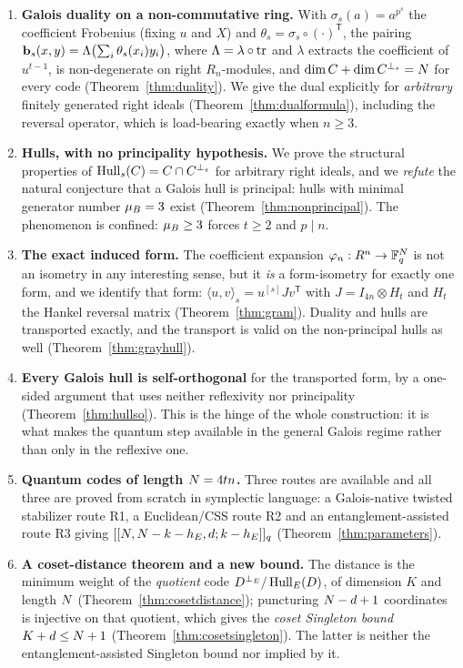 \begin{enumerate}[label=\textnormal{(\arabic*)},leftmargin=*]
\item \textbf{Galois duality on a non-commutative ring.} With
  $\sigma_s(a)=a^{p^s}$ the coefficient Frobenius (fixing $u$ and $X$) and
  $\theta_s=\sigma_s\circ(\cdot)^{\mathsf T}$, the pairing
  $\mathbf b_s(x,y)=\Lambda\bigl(\sum_i\theta_s(x_i)y_i\bigr)$, where
  $\Lambda=\lambda\circ\operatorname{tr}$ and $\lambda$ extracts the coefficient of
  $u^{t-1}$, is non-degenerate on right $R_n$-modules, and
  $\dim C+\dim C^{\perp_s}=N$ for every code (Theorem~\ref{thm:duality}).
  We give the dual explicitly for \emph{arbitrary} finitely generated right
  ideals (Theorem~\ref{thm:dualformula}), including the reversal operator,
  which is load-bearing exactly when $n\ge3$.

\item \textbf{Hulls, with no principality hypothesis.} We prove the structural
  properties of $\operatorname{Hull}_s(C)=C\cap C^{\perp_s}$ for arbitrary right ideals, and
  we \emph{refute} the natural conjecture that a Galois hull is principal: hulls
  with minimal generator number $\mu_B=3$ exist
  (Theorem~\ref{thm:nonprincipal}). The phenomenon is confined:
  $\mu_B\ge3$ forces $t\ge2$ and $p\mid n$.

\item \textbf{The exact induced form.} The coefficient expansion
  $\varphi_n:R^n\to\mathbb F_q^{N}$ is not an isometry in any interesting sense,
  but it \emph{is} a form-isometry for exactly one form, and we identify that
  form: $\langle u,v\rangle^{\widehat{}}_s=u^{[s]}Jv^{\mathsf T}$ with
  $J=I_{4n}\otimes H_t$ and $H_t$ the Hankel reversal matrix
  (Theorem~\ref{thm:gram}). Duality and hulls are transported exactly, and the
  transport is valid on the non-principal hulls as well
  (Theorem~\ref{thm:grayhull}).

\item \textbf{Every Galois hull is self-orthogonal} for the transported form,
  by a one-sided argument that uses neither reflexivity nor principality
  (Theorem~\ref{thm:hullso}). This is the hinge of the whole construction: it
  is what makes the quantum step available in the general Galois regime rather
  than only in the reflexive one.

\item \textbf{Quantum codes of length $N=4tn$.} Three routes are available
  and all three are proved from scratch in symplectic language: a Galois-native
  twisted stabilizer route R1, a Euclidean/CSS route R2 and an
  entanglement-assisted route R3 giving
  $[[N,N-k-h_E,d;k-h_E]]_q$ (Theorem~\ref{thm:parameters}).

\item \textbf{A coset-distance theorem and a new bound.} The distance is the
  minimum weight of the \emph{quotient} code
  $D^{\perp_E}/\operatorname{Hull}_E(D)$, of dimension $K$ and length $N$
  (Theorem~\ref{thm:cosetdistance}); puncturing $N-d+1$ coordinates is
  injective on that quotient, which gives the \emph{coset Singleton bound}
  $K+d\le N+1$ (Theorem~\ref{thm:cosetsingleton}). The latter is neither
  the entanglement-assisted Singleton bound nor implied by it.
\end{enumerate}

